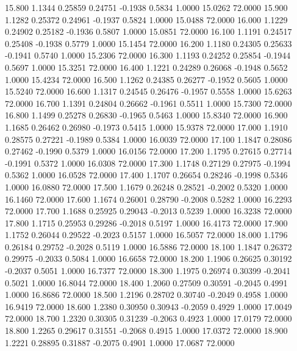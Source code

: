   15.800   1.1344   0.25859   0.24751  -0.1938   0.5834   1.0000  15.0262  72.0000
  15.900   1.1282   0.25372   0.24961  -0.1937   0.5824   1.0000  15.0488  72.0000
  16.000   1.1229   0.24902   0.25182  -0.1936   0.5807   1.0000  15.0851  72.0000
  16.100   1.1191   0.24517   0.25408  -0.1938   0.5779   1.0000  15.1454  72.0000
  16.200   1.1180   0.24305   0.25633  -0.1941   0.5740   1.0000  15.2306  72.0000
  16.300   1.1193   0.24252   0.25854  -0.1944   0.5697   1.0000  15.3251  72.0000
  16.400   1.1221   0.24289   0.26068  -0.1948   0.5652   1.0000  15.4234  72.0000
  16.500   1.1262   0.24385   0.26277  -0.1952   0.5605   1.0000  15.5240  72.0000
  16.600   1.1317   0.24545   0.26476  -0.1957   0.5558   1.0000  15.6263  72.0000
  16.700   1.1391   0.24804   0.26662  -0.1961   0.5511   1.0000  15.7300  72.0000
  16.800   1.1499   0.25278   0.26830  -0.1965   0.5463   1.0000  15.8340  72.0000
  16.900   1.1685   0.26462   0.26980  -0.1973   0.5415   1.0000  15.9378  72.0000
  17.000   1.1910   0.28575   0.27221  -0.1989   0.5384   1.0000  16.0039  72.0000
  17.100   1.1847   0.28086   0.27462  -0.1990   0.5379   1.0000  16.0156  72.0000
  17.200   1.1795   0.27615   0.27714  -0.1991   0.5372   1.0000  16.0308  72.0000
  17.300   1.1748   0.27129   0.27975  -0.1994   0.5362   1.0000  16.0528  72.0000
  17.400   1.1707   0.26654   0.28246  -0.1998   0.5346   1.0000  16.0880  72.0000
  17.500   1.1679   0.26248   0.28521  -0.2002   0.5320   1.0000  16.1460  72.0000
  17.600   1.1674   0.26001   0.28790  -0.2008   0.5282   1.0000  16.2293  72.0000
  17.700   1.1688   0.25925   0.29043  -0.2013   0.5239   1.0000  16.3238  72.0000
  17.800   1.1715   0.25953   0.29286  -0.2018   0.5197   1.0000  16.4173  72.0000
  17.900   1.1752   0.26044   0.29522  -0.2023   0.5157   1.0000  16.5057  72.0000
  18.000   1.1796   0.26184   0.29752  -0.2028   0.5119   1.0000  16.5886  72.0000
  18.100   1.1847   0.26372   0.29975  -0.2033   0.5084   1.0000  16.6658  72.0000
  18.200   1.1906   0.26625   0.30192  -0.2037   0.5051   1.0000  16.7377  72.0000
  18.300   1.1975   0.26974   0.30399  -0.2041   0.5021   1.0000  16.8044  72.0000
  18.400   1.2060   0.27509   0.30591  -0.2045   0.4991   1.0000  16.8686  72.0000
  18.500   1.2196   0.28702   0.30740  -0.2049   0.4958   1.0000  16.9419  72.0000
  18.600   1.2380   0.30950   0.30943  -0.2059   0.4929   1.0000  17.0049  72.0000
  18.700   1.2320   0.30305   0.31239  -0.2063   0.4923   1.0000  17.0179  72.0000
  18.800   1.2265   0.29617   0.31551  -0.2068   0.4915   1.0000  17.0372  72.0000
  18.900   1.2221   0.28895   0.31887  -0.2075   0.4901   1.0000  17.0687  72.0000
